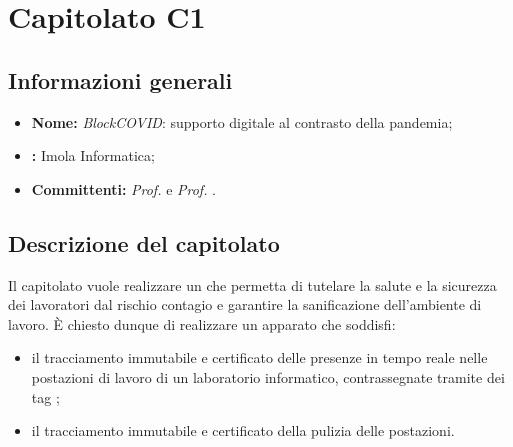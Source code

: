 \section{Capitolato C1}

\subsection{Informazioni generali}
\begin{itemize}
\item \textbf{Nome:} \textit{BlockCOVID}: supporto digitale al contrasto della pandemia;
\item \textbf{:} Imola Informatica;
\item \textbf{Committenti:} \textit{Prof. \Tullio{}} e \textit{Prof. \Riccardo{}}.
\end{itemize}

\subsection{Descrizione del capitolato}
Il capitolato vuole realizzare un  che permetta di tutelare la salute e la sicurezza dei lavoratori dal rischio contagio e garantire la sanificazione dell'ambiente di lavoro. È chiesto dunque di realizzare un apparato che soddisfi:
\begin{itemize}
\item il tracciamento immutabile e certificato delle presenze in tempo reale nelle postazioni di lavoro di un laboratorio informatico, contrassegnate tramite dei tag ;
\item il tracciamento immutabile e certificato della pulizia delle postazioni.
\end{itemize}
